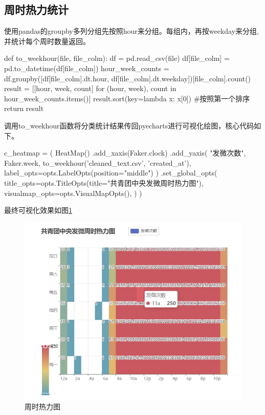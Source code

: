 \subsection{周时热力统计}
\par{使用pandas的groupby多列分组先按照hour来分组。每组内，再按weekday来分组,并统计每个周时数量返回。}
\begin{python}
def to_weekhour(file, file_colm):
    df = pd.read_csv(file)
    df[file_colm] = pd.to_datetime(df[file_colm])
    hour_week_counts = df.groupby([df[file_colm].dt.hour, df[file_colm].dt.weekday])[file_colm].count()
    result = [[hour, week, count] for (hour, week), count in hour_week_counts.items()]
    result.sort(key=lambda x: x[0]) #按照第一个排序
    return result
\end{python}
\par{调用to\_weekhour函数将分类统计结果传回pyecharts进行可视化绘图，核心代码如下。}
\begin{python}
    c_heatmap = (
        HeatMap()
        .add_xaxis(Faker.clock)
        .add_yaxis(
            "发微次数", Faker.week, to_weekhour('cleaned_text.csv', 'created_at'),
            label_opts=opts.LabelOpts(position="middle")
        )
        .set_global_opts(
            title_opts=opts.TitleOpts(title="共青团中央发微周时热力图"),
            visualmap_opts=opts.VisualMapOpts(),
        )
    )
\end{python}
最终可视化效果如图\ref{fig:weekdayhour}
\begin{figure}[H]
    \begin{center}
    \includegraphics[width=14cm]{figure/weekday_hour.jpg}
    \caption{周时热力图}  \label{fig:weekdayhour}
    \end{center}
\end{figure}

